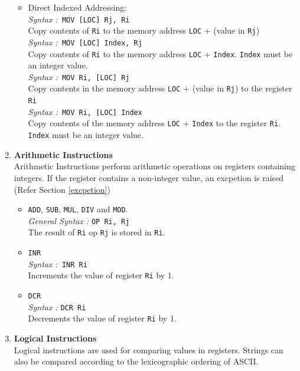 \documentclass[11pt]{report}
\begin{document}
\begin{enumerate}
\begin{itemize}
\item Direct Indexed Addressing: \\
\textit{Syntax :}\texttt{ MOV [LOC] Rj, Ri}\\
Copy contents of \texttt{Ri} to the memory address \texttt{LOC} + (value in \texttt{Rj}) \\
\textit{Syntax :}\texttt{ MOV [LOC] Index, Rj}\\
Copy contents of \texttt{Ri} to the memory address \texttt{LOC} + \texttt{Index}. \texttt{Index} must be an integer value. \\
\textit{Syntax :}\texttt{ MOV Ri, [LOC] Rj}\\
Copy contents in the memory address \texttt{LOC} + (value in \texttt{Rj}) to the register \texttt{Ri}\\
\textit{Syntax :}\texttt{ MOV Ri, [LOC] Index}\\
Copy contents of the memory address \texttt{LOC} + \texttt{Index} to the register \texttt{Ri}. \texttt{Index} must be an integer value. \\
\end{itemize}


\item\textbf{ Arithmetic Instructions}
\\
Arithmetic Instructions perform arithmetic operations on registers containing integers. If the register contains a non-integer value, an excpetion is raised (Refer Section \ref{excpetion})
\begin{itemize}
\item \texttt{ADD}, \texttt{SUB}, \texttt{MUL}, \texttt{DIV} and \texttt{MOD}.\\
\textit{General Syntax :} \texttt{OP Ri, Rj}\\
The result of \texttt{Ri} op \texttt{Rj} is stored in \texttt{Ri}. 

\item \texttt{INR\\}
\textit{Syntax :}\texttt{ INR Ri}\\
Increments the value of register \texttt{Ri} by 1.  

\item  \texttt{DCR}\\
\textit{Syntax :} \texttt{DCR Ri}\\
Decrements the value of register \texttt{Ri} by 1. 

\end{itemize}


\item \textbf{Logical Instructions} \\
Logical instructions are used for comparing values in registers. Strings can also be compared according to the lexicographic ordering of ASCII.
\begin{itemize}


\end{itemize}
\end{enumerate}
\end{document}
